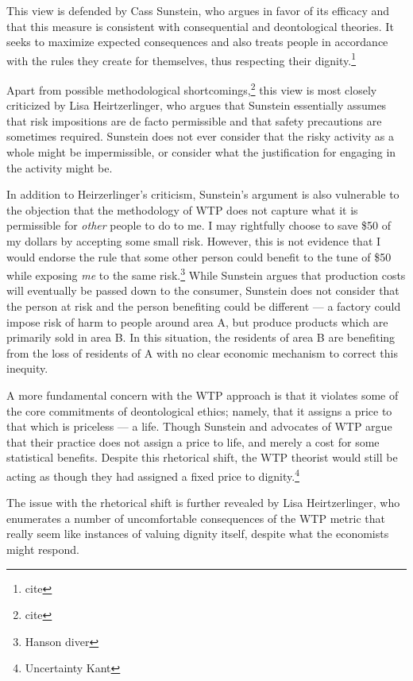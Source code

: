 This view is defended by Cass Sunstein, who argues in favor of its efficacy and
that this measure is consistent with consequential and deontological theories.
It seeks to maximize expected consequences and also treats people in accordance
with the rules they create for themselves, thus respecting their
dignity.\footnote{cite}

Apart from possible methodological shortcomings,\footnote{cite} this view is
most closely criticized by Lisa Heirtzerlinger, who argues that Sunstein
essentially assumes that risk impositions are de facto permissible and that
safety precautions are sometimes required. Sunstein does not ever consider that
the risky activity as a whole might be impermissible, or consider what the
justification for engaging in the activity might be.

In addition to Heirzerlinger’s criticism, Sunstein’s argument is also
vulnerable to the objection that the methodology of WTP does not capture what
it is permissible for \emph{other} people to do to me. I may rightfully choose
to save \$50 of my dollars by accepting some small risk. However, this is not
evidence that I would endorse the rule that some other person could benefit to
the tune of \$50 while exposing \emph{me} to the same risk.\footnote{Hanson
diver} While Sunstein argues that production costs will eventually be passed
down to the consumer, Sunstein does not consider that the person at risk and
the person benefiting could be different --- a factory could impose risk of
harm to people around area A, but produce products which are primarily sold in
area B. In this situation, the residents of area B are benefiting from the loss
of residents of A with no clear economic mechanism to correct this inequity.

A more fundamental concern with the WTP approach is that it violates some of
the core commitments of deontological ethics; namely, that it assigns a price
to that which is priceless --- a life. Though Sunstein and advocates of WTP
argue that their practice does not assign a price to life, and merely a cost
for some statistical benefits. Despite this rhetorical shift, the WTP theorist
would still be acting as though they had assigned a fixed price to
dignity.\footnote{Uncertainty Kant}

The issue with the rhetorical shift is further revealed by Lisa Heirtzerlinger,
who enumerates a number of uncomfortable consequences of the WTP metric that
really seem like instances of valuing dignity itself, despite what the
economists might respond.

